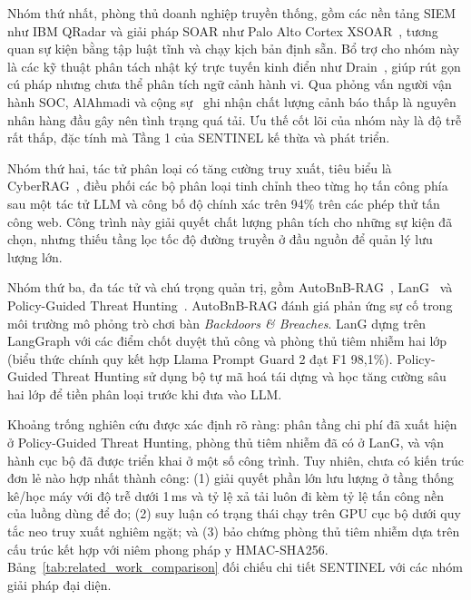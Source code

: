 Nhóm thứ nhất, phòng thủ doanh nghiệp truyền thống, gồm các nền tảng SIEM như IBM QRadar và giải pháp SOAR như Palo Alto Cortex XSOAR~\cite{siem2021, soar2025}, tương quan sự kiện bằng tập luật tĩnh và chạy kịch bản định sẵn. Bổ trợ cho nhóm này là các kỹ thuật phân tách nhật ký trực tuyến kinh điển như Drain~\cite{he2017drain}, giúp rút gọn cú pháp nhưng chưa thể phân tích ngữ cảnh hành vi. Qua phỏng vấn người vận hành SOC, AlAhmadi và cộng sự~\cite{alahmadi2022} ghi nhận chất lượng cảnh báo thấp là nguyên nhân hàng đầu gây nên tình trạng quá tải. Ưu thế cốt lõi của nhóm này là độ trễ rất thấp, đặc tính mà Tầng 1 của SENTINEL kế thừa và phát triển.

Nhóm thứ hai, tác tử phân loại có tăng cường truy xuất, tiêu biểu là CyberRAG~\cite{cyberrag2025}, điều phối các bộ phân loại tinh chỉnh theo từng họ tấn công phía sau một tác tử LLM và công bố độ chính xác trên 94\% trên các phép thử tấn công web. Công trình này giải quyết chất lượng phân tích cho những sự kiện đã chọn, nhưng thiếu tầng lọc tốc độ đường truyền ở đầu nguồn để quản lý lưu lượng lớn.

Nhóm thứ ba, đa tác tử và chú trọng quản trị, gồm AutoBnB-RAG~\cite{autobnb2025}, LanG~\cite{lang2026} và Policy-Guided Threat Hunting~\cite{splunkllm2026}. AutoBnB-RAG đánh giá phản ứng sự cố trong môi trường mô phỏng trò chơi bàn \textit{Backdoors \& Breaches}. LanG dựng trên LangGraph với các điểm chốt duyệt thủ công và phòng thủ tiêm nhiễm hai lớp (biểu thức chính quy kết hợp Llama Prompt Guard 2 đạt F1 98,1\%). Policy-Guided Threat Hunting sử dụng bộ tự mã hoá tái dựng và học tăng cường sâu hai lớp để tiền phân loại trước khi đưa vào LLM.

Khoảng trống nghiên cứu được xác định rõ ràng: phân tầng chi phí đã xuất hiện ở Policy-Guided Threat Hunting, phòng thủ tiêm nhiễm đã có ở LanG, và vận hành cục bộ đã được triển khai ở một số công trình. Tuy nhiên, chưa có kiến trúc đơn lẻ nào hợp nhất thành công: (1) giải quyết phần lớn lưu lượng ở tầng thống kê/học máy với độ trễ dưới 1\,ms và tỷ lệ xả tải luôn đi kèm tỷ lệ tấn công nền của luồng dùng để đo; (2) suy luận có trạng thái chạy trên GPU cục bộ dưới quy tắc neo truy xuất nghiêm ngặt; và (3) bảo chứng phòng thủ tiêm nhiễm dựa trên cấu trúc kết hợp với niêm phong pháp y HMAC-SHA256. Bảng~\ref{tab:related_work_comparison} đối chiếu chi tiết SENTINEL với các nhóm giải pháp đại diện.

